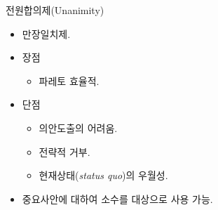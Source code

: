 \documentclass[aspectratio=169,xcolor=dvipsnames,handout]{beamer}
\begin{document}
\begin{frame}{전원합의제(Unanimity)}
    \begin{itemize}[<+->]
        \item 만장일치제.
        \item 장점
        \begin{itemize}
            \item 파레토 효율적.
        \end{itemize}
        \item 단점
        \begin{itemize}
            \item 의안도출의 어려움.
            \item 전략적 거부.
            \item 현재상태({\it status quo})의 우월성.
        \end{itemize}
        \item 중요사안에 대하여 소수를 대상으로 사용 가능.
    \end{itemize}
\end{frame}
\end{document}
